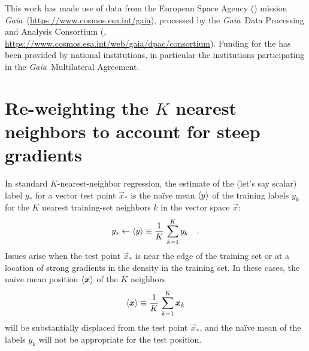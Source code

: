 \documentclass[modern]{aastex63}
\newcommand{\gaia}{\textsl{Gaia}}
\newcommand{\apogee}{\acronym{APOGEE}}
\newcommand{\sdss}{\acronym{SDSS}}
\begin{document}
This work has made use of data from the European Space Agency ()
mission \gaia\ (\url{https://www.cosmos.esa.int/gaia}), processed by the \gaia\
Data Processing and Analysis Consortium (,
\url{https://www.cosmos.esa.int/web/gaia/dpac/consortium}). Funding for the
\acronym{DPAC}
has been provided by national institutions, in particular the institutions
participating in the \gaia\ Multilateral Agreement.



\appendix

\section{Re-weighting the $K$ nearest neighbors to account for steep gradients}
\label{app:knn-weights}

In standard $K$-nearest-neighbor regression, the estimate of the
(let's say scalar) label $y_\ast$ for a vector test point
$\vec{x}_\ast$ is the na\"ive mean $\left\langle y \right\rangle$ of the training labels $y_k$ for the $K$
nearest training-set neighbors $k$ in the vector space $\vec{x}$:
\begin{equation}
  y_\ast \leftarrow \mean{y} \equiv \frac{1}{K}\,\sum_{k=1}^K y_k
  \quad .
\end{equation}
Issues arise when the test point $\vec{x}_\ast$ is near the edge of
the training set or at a location of strong gradients in the density
in the training set.
In these cases, the na\"ive mean position $\left\langle \boldsymbol{x} \right\rangle$ of the $K$ neighbors
\begin{equation}
  \mean{\vec{x}} \equiv \frac{1}{K}\,\sum_{k=1}^K \vec{x}_k
\end{equation}
will be substantially displaced from the test point $\vec{x}_\ast$, and
the na\"ive mean of the labels $y_k$ will not be appropriate for the
test position.
\end{document}
